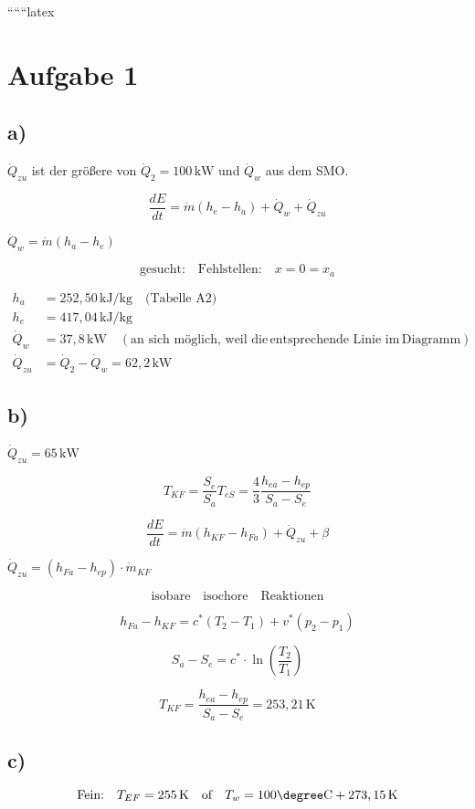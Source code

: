 
``````latex


\section*{Aufgabe 1}

\subsection*{a)}
\(\dot{Q}_{zu}\) ist der größere von \(\dot{Q}_2 = 100 \, \text{kW}\) und \(\dot{Q}_w\) aus dem SMO.

\[
\frac{dE}{dt} = \dot{m} (h_e - h_a) + \dot{Q}_w + \dot{Q}_{zu}
\]

\(\dot{Q}_w = \dot{m} (h_a - h_e)\)

\[
\text{gesucht:} \quad \text{Fehlstellen:} \quad x = 0 = x_a
\]

\[
\begin{aligned}
    h_a &= 252,50 \, \text{kJ/kg} \quad \text{(Tabelle A2)} \\
    h_e &= 417,04 \, \text{kJ/kg} \\
    \dot{Q}_w &= 37,8 \, \text{kW} \quad \left(\text{an sich möglich, weil die} \, \text{entsprechende Linie im} \, \text{Diagramm}\right) \\
    \dot{Q}_{zu} &= \dot{Q}_2 - \dot{Q}_w = 62,2 \, \text{kW}
\end{aligned}
\]

\subsection*{b)}
\(\dot{Q}_{zu} = 65 \, \text{kW}\)

\[
T_{KF} = \frac{S_e}{S_a} T_{eS} = \frac{4}{3} \frac{h_{ea} - h_{ep}}{S_a - S_e}
\]

\[
\frac{dE}{dt} = \dot{m} (h_{KF} - h_{Fa}) + \dot{Q}_{zu} + \beta
\]

\(\dot{Q}_{zu} = (h_{Fa} - h_{ep}) \cdot \dot{m}_{KF}\)

\[
\text{isobare} \quad \text{isochore} \quad \text{Reaktionen}
\]

\[
h_{Fa} - h_{KF} = c^* (T_2 - T_1) + v^* (p_2 - p_1)
\]

\[
S_a - S_e = c^* \cdot \ln \left( \frac{T_2}{T_1} \right)
\]

\[
T_{KF} = \frac{h_{ea} - h_{ep}}{S_a - S_e} = 253,21 \, \text{K}
\]

\subsection*{c)}
\[
\text{Fein:} \quad T_{EF} = 255 \, \text{K} \quad \text{of} \quad T_w = 100 \degree \text{C} + 273,15 \, \text{K}
\]


